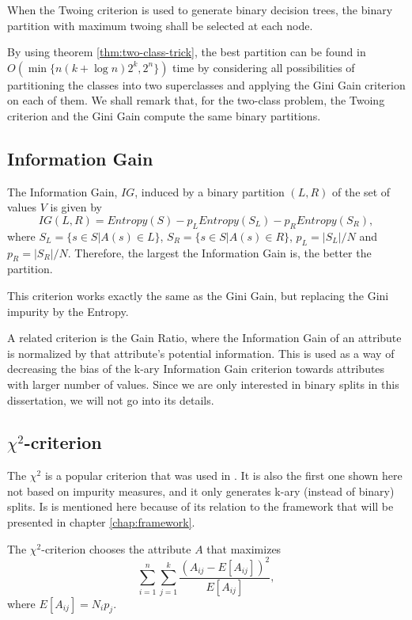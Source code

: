 When the Twoing criterion is used to generate binary decision trees, the binary partition with maximum twoing shall be selected at each node. 

By using theorem \ref{thm:two-class-trick}, the best partition can be found in $O(\min \{ n (k + \log n) 2^k, 2^n \} )$
time by considering all possibilities of partitioning the classes into two superclasses
and applying the Gini Gain criterion on each of them. We shall remark that, for the two-class problem, the Twoing criterion and the Gini Gain compute the same binary partitions.

\subsection{Information Gain}

The Information Gain, $IG$, induced by a binary partition $(L,R)$ 
of the set of values $V$ is given by 
\begin{equation}
 IG(L,R) = Entropy(S) -
p_L Entropy(S_L) - p_R Entropy(S_R),
\label{eq:InformationGain}
\end{equation}
where $S_L= \{ s \in S | A(s) \in L \}$, $S_R= \{ s \in S | A(s) \in R \}$,
 $p_L=|S_L| /N $ and $p_R=|S_R| /N$. Therefore, the largest the Information Gain is, the better the partition.

This criterion works exactly the same as the Gini Gain, but replacing the Gini impurity by the Entropy.

A related criterion is the Gain Ratio, where the Information Gain of an attribute is normalized by that attribute's potential information. This is used as a way of decreasing the bias of the k-ary Information Gain criterion towards attributes with larger number of values. Since we are only interested in binary splits in this dissertation, we will not go into its details.


\subsection{$\chi^2$-criterion}
The $\chi^2$ is a popular criterion that was  used in \cite{Mingers.87}. It is also the first one shown here not based on impurity measures, and it only generates k-ary (instead of binary) splits. Is is mentioned here because of its relation to the framework that will be presented in chapter \ref{chap:framework}.

The $\chi^2$-criterion chooses the attribute $A$ that maximizes
\begin{equation}
\label{eq:chitest}
\sum_{i=1}^n \sum_{j=1}^k \frac{(A_{ij}-E[A_{ij}] )^2}{E[A_{ij}]},
\end{equation}
where $E[A_{ij}]=N_i p_j$.


